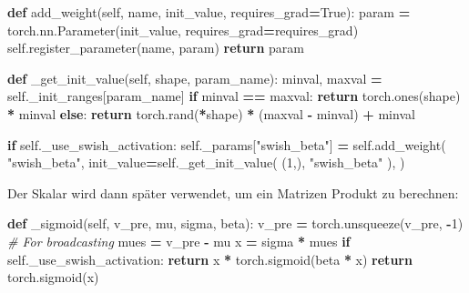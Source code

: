 \documentclass[11pt,ngerman,a4paper,]{article}
\newenvironment{Shaded}{\begin{snugshade}}{\end{snugshade}}
\newcommand{\CommentTok}[1]{\textcolor[rgb]{0.56,0.35,0.01}{\textit{#1}}}
\newcommand{\ControlFlowTok}[1]{\textcolor[rgb]{0.13,0.29,0.53}{\textbf{#1}}}
\newcommand{\DecValTok}[1]{\textcolor[rgb]{0.00,0.00,0.81}{#1}}
\newcommand{\KeywordTok}[1]{\textcolor[rgb]{0.13,0.29,0.53}{\textbf{#1}}}
\newcommand{\NormalTok}[1]{#1}
\newcommand{\OperatorTok}[1]{\textcolor[rgb]{0.81,0.36,0.00}{\textbf{#1}}}
\newcommand{\StringTok}[1]{\textcolor[rgb]{0.31,0.60,0.02}{#1}}
\newcommand{\VariableTok}[1]{\textcolor[rgb]{0.00,0.00,0.00}{#1}}
\begin{document}
\begin{Shaded}
\begin{Highlighting}[numbers=left,,]
\KeywordTok{def}\NormalTok{ add\_weight(}\VariableTok{self}\NormalTok{, name, init\_value, requires\_grad}\OperatorTok{=}\VariableTok{True}\NormalTok{):}
\NormalTok{    param }\OperatorTok{=}\NormalTok{ torch.nn.Parameter(init\_value, requires\_grad}\OperatorTok{=}\NormalTok{requires\_grad)}
    \VariableTok{self}\NormalTok{.register\_parameter(name, param)}
    \ControlFlowTok{return}\NormalTok{ param}

\KeywordTok{def}\NormalTok{ \_get\_init\_value(}\VariableTok{self}\NormalTok{, shape, param\_name):}
\NormalTok{    minval, maxval }\OperatorTok{=} \VariableTok{self}\NormalTok{.\_init\_ranges[param\_name]}
    \ControlFlowTok{if}\NormalTok{ minval }\OperatorTok{==}\NormalTok{ maxval:}
        \ControlFlowTok{return}\NormalTok{ torch.ones(shape) }\OperatorTok{*}\NormalTok{ minval}
    \ControlFlowTok{else}\NormalTok{:}
        \ControlFlowTok{return}\NormalTok{ torch.rand(}\OperatorTok{*}\NormalTok{shape) }\OperatorTok{*}\NormalTok{ (maxval }\OperatorTok{{-}}\NormalTok{ minval) }\OperatorTok{+}\NormalTok{ minval}

\ControlFlowTok{if} \VariableTok{self}\NormalTok{.\_use\_swish\_activation:}
    \VariableTok{self}\NormalTok{.\_params[}\StringTok{"swish\_beta"}\NormalTok{] }\OperatorTok{=} \VariableTok{self}\NormalTok{.add\_weight(}
        \StringTok{"swish\_beta"}\NormalTok{,}
\NormalTok{        init\_value}\OperatorTok{=}\VariableTok{self}\NormalTok{.\_get\_init\_value(}
\NormalTok{            (}\DecValTok{1}\NormalTok{,), }\StringTok{"swish\_beta"}
\NormalTok{        ),}
\NormalTok{    )}
\end{Highlighting}
\end{Shaded}

Der Skalar wird dann später verwendet, um ein Matrizen Produkt zu berechnen:

\singlespacing

\begin{Shaded}
\begin{Highlighting}[numbers=left,,]
\KeywordTok{def}\NormalTok{ \_sigmoid(}\VariableTok{self}\NormalTok{, v\_pre, mu, sigma, beta):}
\NormalTok{    v\_pre }\OperatorTok{=}\NormalTok{ torch.unsqueeze(v\_pre, }\OperatorTok{{-}}\DecValTok{1}\NormalTok{)  }\CommentTok{\# For broadcasting}
\NormalTok{    mues }\OperatorTok{=}\NormalTok{ v\_pre }\OperatorTok{{-}}\NormalTok{ mu}
\NormalTok{    x }\OperatorTok{=}\NormalTok{ sigma }\OperatorTok{*}\NormalTok{ mues}
    \ControlFlowTok{if} \VariableTok{self}\NormalTok{.\_use\_swish\_activation:}
        \ControlFlowTok{return}\NormalTok{ x }\OperatorTok{*}\NormalTok{ torch.sigmoid(beta }\OperatorTok{*}\NormalTok{ x)}
    \ControlFlowTok{return}\NormalTok{ torch.sigmoid(x)}
\end{Highlighting}
\end{Shaded}
\end{document}

